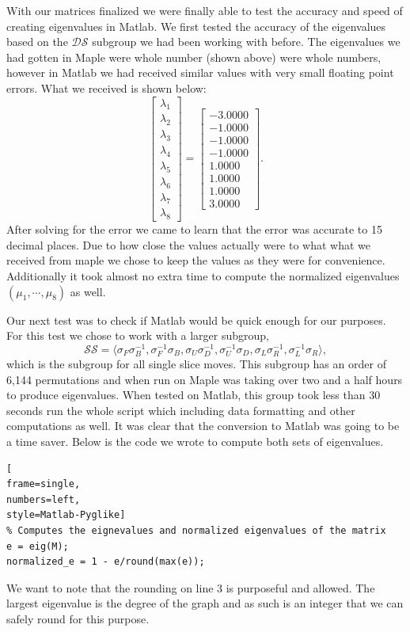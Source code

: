 \documentclass{article}
\begin{document}
With our matrices finalized we were finally able to test the accuracy and speed of creating eigenvalues in Matlab.  We first tested the accuracy of the eigenvalues based on the $\mathcal{DS}$ subgroup we had been working with before.  The eigenvalues we had gotten in Maple were whole number (shown above) were whole numbers, however in Matlab  we had received similar values with very small floating point errors.  What we received is shown below:
$$ \begin{bmatrix}
    \lambda_1 \\ \lambda_2 \\ \lambda_3 \\ \lambda_4 \\ \lambda_5 \\ \lambda_6 \\ \lambda_7 \\ \lambda_8
\end{bmatrix} = 
\begin{bmatrix}
    -3.0000 \\ -1.0000 \\ -1.0000 \\ -1.0000 \\ 1.0000 \\ 1.0000 \\ 1.0000 \\ 3.0000
\end{bmatrix}.$$
After solving for the error we came to learn that the error was accurate to 15 decimal places.  Due to how close the values actually were to what what we received from maple we chose to keep the values as they were for convenience.  Additionally it took almost no extra time to compute the normalized eigenvalues $(\mu_1,\cdots,\mu_8)$ as well.

Our next test was to check if Matlab would be quick enough for our purposes. For this test we chose to work with a larger subgroup, $$\mathcal{SS} = \langle\sigma_F\sigma_B^{-1},\sigma_F^{-1}\sigma_B,\sigma_U\sigma_D^{-1},\sigma_U^{-1}\sigma_D,\sigma_L\sigma_R^{-1},\sigma_L^{-1}\sigma_R\rangle,$$ which is the subgroup for all single slice moves.  This subgroup has an order of 6,144 permutations and when run on Maple was taking over two and a half hours to produce eigenvalues.  When tested on Matlab, this group took less than 30 seconds run the whole script which including data formatting and other computations as well.  It was clear that the conversion to Matlab was going to be a time saver.  Below is the code we
wrote to compute both sets of eigenvalues.
\begin{lstlisting}[
frame=single,
numbers=left,
style=Matlab-Pyglike]
% Computes the eignevalues and normalized eigenvalues of the matrix
e = eig(M);
normalized_e = 1 - e/round(max(e));
\end{lstlisting}
We want to note that the rounding on line 3 is purposeful and allowed.  The largest eigenvalue is the degree of the graph and as such is an integer that we can safely round for this purpose.
\end{document}
